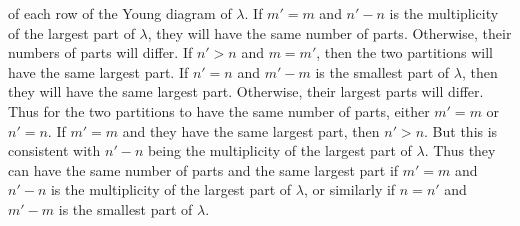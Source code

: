 {{of each row of the Young diagram of $\lambda$.  If $m'=m$ and $n'-n$
is the multiplicity of the largest part of $\lambda$, they
will have the same number of parts.  Otherwise, their numbers of
parts will differ.  If
$n'>n$ and
$m=m'$, then the two partitions will have the same largest part.  If
$n'=n$ and $m'-m$ is the smallest part of $\lambda$,
then they will have the same largest part.  Otherwise, their largest
parts will differ.  Thus for the two partitions to have the same
number of parts, either $m'=m$ or $n'=n$.  If $m'=m$ and they have the
same largest part, then $n'>n$.  But this is consistent with $n'-n$
being the multiplicity of the largest part of $\lambda$.  Thus they can
have the same number of parts and the same largest part if $m'=m$ and
$n'-n$ is the multiplicity of the largest part of $\lambda$, or
similarly if
$n=n'$ and $m'-m$ is the smallest part of $\lambda$.}


}
